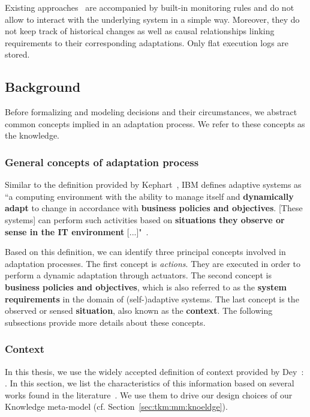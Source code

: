 Existing approaches~\cite{hassel13,DBLP:conf/models/HeinrichSJRMHRP14,DBLP:conf/icac/EhlersHWH11,DBLP:conf/icse/MendoncaAR14,DBLP:conf/icse/CasanovaGSA14,DBLP:conf/icse/IftikharW14a} are accompanied by built-in monitoring rules and do not allow to interact with the underlying system in a simple way. 
Moreover, they do not keep track of historical changes as well as causal relationships linking requirements to their corresponding adaptations. Only flat execution logs are stored. 

\subsection{Background}
Before formalizing and modeling decisions and their circumstances, we abstract common concepts implied in an adaptation process. We refer to these concepts as the knowledge.

\subsubsection{General concepts of adaptation process}

Similar to the definition provided by Kephart~\cite{DBLP:journals/computer/KephartC03}, IBM  defines adaptive systems as ``a computing environment with the ability to manage itself and \textbf{dynamically adapt} to change in accordance with \textbf{business policies and objectives}. [These systems] can perform such activities based on \textbf{situations they observe or sense in the IT environment} [...]"~\cite{computing2006architectural}.

Based on this definition, we can identify three principal concepts involved in adaptation processes.
The first concept is  \textit{actions}. They are executed in order to perform a dynamic adaptation through actuators.
The second concept is \textbf{business policies and objectives}, which is also referred to as the \textbf{system requirements} in the domain of (self-)adaptive systems.
The last concept is the observed or sensed \textbf{situation}, also known as the \textbf{context}.
The following subsections provide more details about these concepts.

\subsubsection{Context}

In this thesis, we use the widely accepted definition of context provided by \linebreak Dey~\cite{DBLP:journals/puc/Dey01}: .
In this section, we list the characteristics of this information based on several works found in the literature~\cite{DBLP:conf/pervasive/HenricksenIR02, DBLP:conf/seke/0001FNMKT14, DBLP:journals/percom/BettiniBHINRR10, DBLP:journals/comsur/PereraZCG14}.
We use them to drive our design choices of our Knowledge meta-model (cf. Section~\ref{sec:tkm:mm:knoeldge}).

